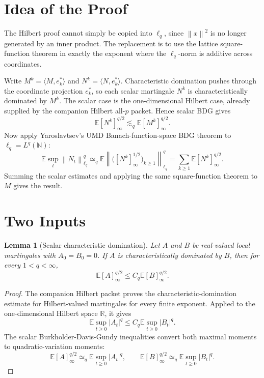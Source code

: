 \documentclass[11pt]{article}
\newtheorem{lemma}{Lemma}
\newcommand{\E}{\mathbb E}
\newcommand{\R}{\mathbb R}
\newcommand{\norm}[1]{\left\lVert #1\right\rVert}
\newcommand{\simequiv}{\simeq}
\begin{document}
\section*{Idea of the Proof}

The Hilbert proof cannot simply be copied into \(\ell_q\), since
\(\norm{x}^2\) is no longer generated by an inner product.  The replacement is
to use the lattice square-function theorem in exactly the exponent where the
\(\ell_q\)-norm is additive across coordinates.

Write \(M^k=\langle M,e_k^*\rangle\) and \(N^k=\langle N,e_k^*\rangle\).
Characteristic domination pushes through the coordinate projection \(e_k^*\),
so each scalar martingale \(N^k\) is characteristically dominated by \(M^k\).
The scalar case is the one-dimensional Hilbert case, already supplied by the
companion Hilbert all-\(p\) packet.  Hence scalar BDG gives
\[
  \E [N^k]_\infty^{q/2}
  \lesssim_q
  \E [M^k]_\infty^{q/2}.
\]
Now apply Yaroslavtsev's UMD Banach-function-space BDG theorem
\cite{Yaroslavtsev2018} to \(\ell_q=L^q(\mathbb N)\):
\[
  \E \sup_t\norm{N_t}_{\ell_q}^{q}
  \simequiv_q
  \E \left\|\bigl([N^k]_\infty^{1/2}\bigr)_{k\ge1}\right\|_{\ell_q}^{q}
  =
  \sum_{k\ge1}\E [N^k]_\infty^{q/2}.
\]
Summing the scalar estimates and applying the same square-function theorem to
\(M\) gives the result.

\section*{Two Inputs}

\begin{lemma}[Scalar characteristic domination]
\label{lem:scalar-input}
Let \(A\) and \(B\) be real-valued local martingales with \(A_0=B_0=0\).  If
\(A\) is characteristically dominated by \(B\), then for every
\(1<q<\infty\),
\[
  \E [A]_\infty^{q/2}
  \leq
  C_q \E [B]_\infty^{q/2}.
\]
\end{lemma}

\begin{proof}
The companion Hilbert packet \cite{Lane19HilbertPacket} proves the
characteristic-domination estimate for Hilbert-valued martingales for every
finite exponent.  Applied to the one-dimensional Hilbert space \(\R\), it gives
\[
   \E\sup_{t\ge0}|A_t|^q
   \leq
   C_q \E\sup_{t\ge0}|B_t|^q .
\]
The scalar Burkholder-Davis-Gundy inequalities convert both maximal moments to
quadratic-variation moments:
\[
   \E [A]_\infty^{q/2}
   \simequiv_q
   \E\sup_{t\ge0}|A_t|^q,
   \qquad
   \E [B]_\infty^{q/2}
   \simequiv_q
   \E\sup_{t\ge0}|B_t|^q .
\]
\end{proof}
\end{document}

